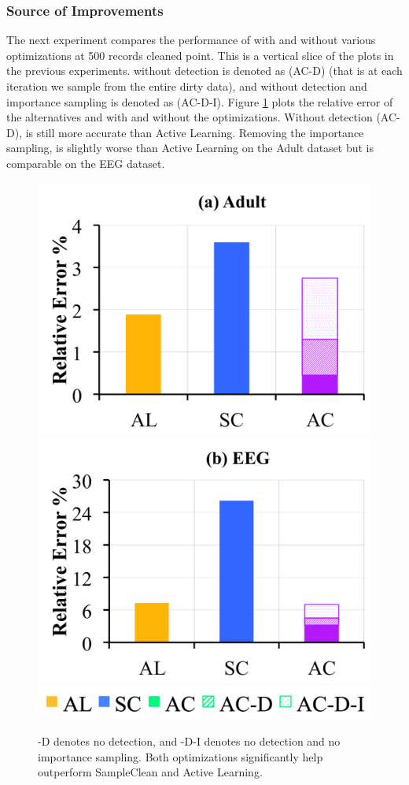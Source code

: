 \subsubsection{Source of Improvements}\label{comp}
The next experiment compares the performance of \sys with and without various optimizations at 500 records cleaned point. 
This is a vertical slice of the plots in the previous experiments.
\sys without detection is denoted as (AC-D) (that is at each iteration we sample from the entire dirty data), and \sys without detection and importance sampling is denoted as (AC-D-I).
Figure \ref{opts} plots the relative error of the alternatives and \sys with and without the optimizations.
Without detection (AC-D), \sys is still more accurate than Active Learning.
Removing the importance sampling, \sys is slightly worse than Active Learning on the Adult dataset but is comparable on the EEG dataset.

\begin{figure}[t]\vspace{0.5em}
\centering
 \includegraphics[width=0.49\columnwidth]{exp/exp8a.png}
 \includegraphics[width=0.49\columnwidth]{exp/exp8b.png}
 \includegraphics[width=0.5\columnwidth]{exp/legend-8.png}\vspace{-1em}
 \caption{ -D denotes no detection, and -D-I denotes no detection and no importance sampling. Both optimizations significantly help \sys outperform SampleClean and Active Learning. \label{opts}}\vspace{-1.5em}
\end{figure}

